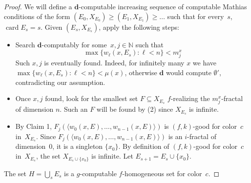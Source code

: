 \documentclass{article}
\numberwithin{theorem}{section}
\newcommand{\ludovic}[1]{\textcolor{blue}{#1}}
\newcommand{\dbf}{\mathbf{d}}
\newcommand{\NN}[0]{\mathbb{N}}
\newcommand{\Spec}[0]{\operatorname{Spec}}
\newcommand{\card}{\operatorname{card}}
\begin{document}
\begin{proof}

We will define a $\dbf$-computable increasing sequence of computable Mathias conditions of the form $(E_0, X_{E_0}) \geq (E_1, X_{E_1}) \geq \dots$ such that for every~$s$, $\card E_s = s$.
Given $(E_s, X_{E_s})$, apply the following steps:
\begin{itemize}
    \item[(S1)] Search $\dbf$-computably for some~$x, j \in \NN$ such that 
$$\max \{ w_\ell(x, E_s) : \ell < n\}< m_j^x$$
Such $x, j$ is eventually found. Indeed, for infinitely many $x$ we have $\max \{ w_\ell(x, E_s) : \ell < n \} < \mu(x)$, otherwise $\dbf$ would compute $\emptyset'$, contradicting our assumption. 
    \item[(S2)] Once $x, j$ found, look for the smallest set $F \subseteq X_{E_s}$  $f$-realizing the $m_j^x$-fractal of dimension $n$. Such an $F$ will be found by (2) since $X_{E_s}$ is infinite.
    \item[(S3)] By Claim 1, $F_j(\langle w_0(x, E), \dots, w_{n-1}(x, E)\rangle)$ is $(f, k)$-good for color~$c$ in~$X_{E_s}$. Since $F_j(\langle w_0(x, E), \dots, w_{n-1}(x, E)\rangle)$ is an $i$-fractal of dimension~0, it is a singleton $\{x_0\}$. By definition of $(f, k)$-good for color~$c$ in~$X_{E_s}$, the set $X_{E_s \cup \{x_0\}}$ is infinite.
    Let $E_{s+1} = E_s \cup \{x_0\}$.
\end{itemize}
The set $H = \bigcup_s E_s$ is a $g$-computable $f$-homogeneous set for color~$c$.



\end{proof}
\end{document}
